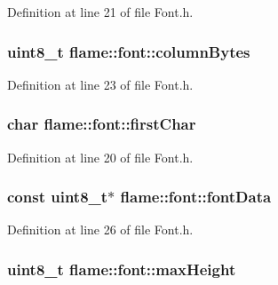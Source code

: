 Definition at line 21 of file Font.\-h.

\hypertarget{structflame_1_1font_aeeec32787794f849a9e0a73a0a9780c5}{
\subsubsection[{column\-Bytes}]{\setlength{\rightskip}{0pt plus 5cm}uint8\-\_\-t flame\-::font\-::column\-Bytes}}\label{structflame_1_1font_aeeec32787794f849a9e0a73a0a9780c5}


Definition at line 23 of file Font.\-h.

\hypertarget{structflame_1_1font_acea33287f36392ee1c9c60af621ddc16}{
\subsubsection[{first\-Char}]{\setlength{\rightskip}{0pt plus 5cm}char flame\-::font\-::first\-Char}}\label{structflame_1_1font_acea33287f36392ee1c9c60af621ddc16}


Definition at line 20 of file Font.\-h.

\hypertarget{structflame_1_1font_a9128d2a44b97261abf7b3e58812e29c8}{
\subsubsection[{font\-Data}]{\setlength{\rightskip}{0pt plus 5cm}const uint8\-\_\-t$\ast$ flame\-::font\-::font\-Data}}\label{structflame_1_1font_a9128d2a44b97261abf7b3e58812e29c8}


Definition at line 26 of file Font.\-h.

\hypertarget{structflame_1_1font_a620b35f9b267bfd1dc0a7cddeef572f3}{
\subsubsection[{max\-Height}]{\setlength{\rightskip}{0pt plus 5cm}uint8\-\_\-t flame\-::font\-::max\-Height}}\label{structflame_1_1font_a620b35f9b267bfd1dc0a7cddeef572f3}


